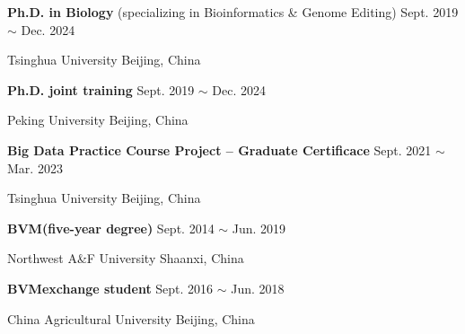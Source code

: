 

\renewcommand{\thefootnote}{\fnsymbol{footnote}}
\setcounter{footnote}{0}
    \textbf{Ph.D. in Biology} (specializing in Bioinformatics \& Genome Editing) \hfill Sept. 2019 $\sim$ Dec. 2024\footnotemark[1]

    Tsinghua University \hfill Beijing, China
    
    \textbf{Ph.D. joint training} \hfill Sept. 2019 $\sim$ Dec. 2024\footnotemark[1]
    
    Peking University \hfill Beijing, China

    \textbf{Big Data Practice Course Project -- Graduate Certificace} \hfill Sept. 2021 $\sim$ Mar. 2023
    
    Tsinghua University \hfill Beijing, China

    \textbf{BVM\footnotemark[2] (five-year degree)} \hfill Sept. 2014 $\sim$ Jun. 2019
    
    Northwest A\&F University \hfill Shaanxi, China

    \textbf{BVM\footnotemark[2] exchange student} \hfill Sept. 2016 $\sim$ Jun. 2018
    
    China Agricultural University \hfill Beijing, China

\renewcommand{\thefootnote}{\arabic{footnote}}
\setcounter{footnote}{1}
